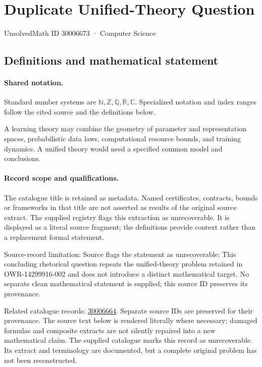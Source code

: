 \documentclass[11pt]{article}
\begin{document}
\setcounter{section}{30006672}
\section{Duplicate Unified-Theory Question}\label{30006673}
{\small\sffamily UnsolvedMath ID 30006673 · Computer Science}
\subsection{Definitions and mathematical statement}

\paragraph{Shared notation.}Standard number systems are $\mathbb N,\mathbb Z,\mathbb Q,\mathbb R,\mathbb C$. Specialized notation and index ranges follow the cited source and the definitions below.


A learning theory may combine the geometry of parameter and representation spaces, probabilistic data laws, computational resource bounds, and training dynamics. A unified theory would need a specified common model and conclusions.
\paragraph{Record scope and qualifications.}
The catalogue title is retained as metadata. Named certificates, contracts, bounds or frameworks in that title are not asserted as results of the original source extract.
The supplied registry flags this extraction as unrecoverable. It is displayed as a literal source fragment; the definitions provide context rather than a replacement formal statement.

Source-record limitation: Source flags the statement as unrecoverable: This concluding rhetorical question repeats the unified-theory problem retained in OWR-14299916-002 and does not introduce a distinct mathematical target. No separate clean mathematical statement is supplied; this source ID preserves its provenance.

Related catalogue records: \href{https://mehmetmars7.github.io/Erdosproblems-llm-hunter/problem.html?type=open_problems&id=30006664}{30006664}. Separate source IDs are preserved for their provenance.
The source text below is rendered literally where necessary; damaged formulas and composite extracts are not silently repaired into a new mathematical claim.
The supplied catalogue marks this record as unrecoverable. Its extract and terminology are documented, but a complete original problem has not been reconstructed.
\end{document}
